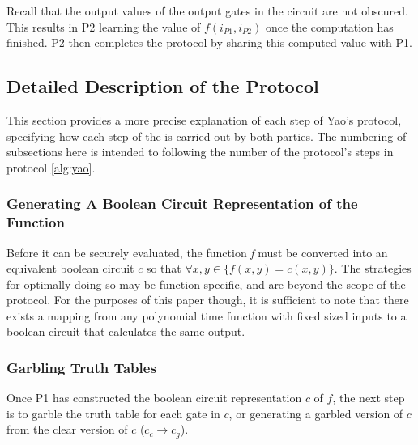 Recall that the output values of the output gates in the circuit are not obscured. This results in \ac{P2} learning the value of $f(i_{P1}, i_{P2})$ once the computation has finished.  \ac{P2} then completes the protocol by sharing this computed value with \ac{P1}.


\subsection{Detailed Description of the Protocol}

This section provides a more precise explanation of each step of Yao's protocol, specifying how each step of the is carried out by both parties.  The numbering of subsections here is intended to following the number of the protocol's steps in protocol \ref{alg:yao}.


\subsubsection{Generating A Boolean Circuit Representation of the Function}

Before it can be securely evaluated, the function \emph{f} must be converted into an equivalent boolean circuit $c$ so that $\forall x, y \in \{f(x, y) = c(x, y)\}$. The strategies for optimally doing so may be function specific, and are beyond the scope of the protocol.  For the purposes of this paper though, it is sufficient to note that there exists a mapping from any polynomial time function with fixed sized inputs to a boolean circuit that calculates the same output\cite{goldreich1987play}.


\subsubsection{Garbling Truth Tables}

Once \ac{P1} has constructed the boolean circuit representation $c$ of $f$, the next step is to garble the truth table for each gate in $c$, or generating a garbled version of $c$ from the clear version of $c$ ($c_c \to c_g$).

